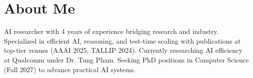 \section{About Me}
\begin{itemize}[leftmargin=0.15in, label={}]
	\small{\item{
		AI researcher with 4 years of experience bridging research and industry. Specialized in efficient AI, reasoning, and test-time scaling with publications at top-tier venues (AAAI 2025, TALLIP 2024). Currently researching AI efficiency at Qualcomm under Dr. Tung Pham. Seeking PhD positions in Computer Science (Fall 2027) to advance practical AI systems.
	}}
\end{itemize}
